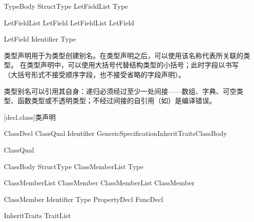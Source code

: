 \begin{bnf}{TypeBody}
    StructType \br
    \terminal{\{} \terminal{\}} \br
    \terminal{\{} LetFieldList \terminal{,}\bnfq \terminal{\}} \br
    \terminal{=} Type
\end{bnf}

\begin{bnf}{LetFieldList}
    LetField \br
    LetFieldList \terminal{,} LetField
\end{bnf}

\begin{bnf}{LetField}
     \bnfq Identifier \terminal{:} Type
\end{bnf}

\pnum
类型声明用于为类型创建别名。在类型声明之后，可以使用该名称代表所关联的类型。
在类型声明中，可以使用大括号代替结构类型的小括号；此时字段以书写（大括号形式不接受顺序字段，也不接受省略的字段声明）。

\pnum
类型别名可以引用其自身：递归必须经过至少一处间接——数组、字典、可空类型、函数类型或不透明类型；不经过间接的自引用（如）是编译错误。

[decl.class]{类声明}

\begin{bnf}{ClassDecl}
    ClassQual\bnfs {} Identifier GenericSpecification\bnfq InheritTraits\bnfq ClassBody
\end{bnf}

\begin{bnf}{ClassQual}
     \br
\end{bnf}

\begin{bnf}{ClassBody}
    StructType \br
    \terminal{\{} ClassMemberList\bnfq \terminal{\}} \br
    \terminal{=} Type
\end{bnf}

\begin{bnf}{ClassMemberList}
    ClassMember \br
    ClassMemberList ClassMember
\end{bnf}

\begin{bnf}{ClassMember}
     \bnfq Identifier \terminal{:} Type \terminal{;}\bnfq \br
    PropertyDecl \br
    FuncDecl
\end{bnf}

\begin{bnf}{InheritTraits}
    \terminal{:} TraitList
\end{bnf}

